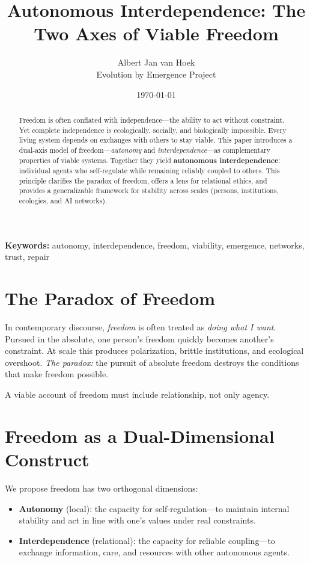 \documentclass[11pt,a4paper]{article}
\title{\textbf{Autonomous Interdependence: The Two Axes of Viable Freedom}}
\author{Albert Jan van Hoek \\ \small Evolution by Emergence Project}
\date{\today}
\begin{document}
\maketitle

\begin{abstract}
Freedom is often conflated with independence---the ability to act without constraint.
Yet complete independence is ecologically, socially, and biologically impossible.
Every living system depends on exchanges with others to stay viable.
This paper introduces a dual-axis model of freedom---\emph{autonomy} and \emph{interdependence}---as complementary properties of viable systems.
Together they yield \textbf{autonomous interdependence}: individual agents who self-regulate while remaining reliably coupled to others.
This principle clarifies the paradox of freedom, offers a lens for relational ethics, and provides a generalizable framework for stability across scales (persons, institutions, ecologies, and AI networks).
\end{abstract}

\noindent\textbf{Keywords:} autonomy, interdependence, freedom, viability, emergence, networks, trust, repair

\section{The Paradox of Freedom}
In contemporary discourse, \emph{freedom} is often treated as \emph{doing what I want}.
Pursued in the absolute, one person's freedom quickly becomes another's constraint.
At scale this produces polarization, brittle institutions, and ecological overshoot.
\emph{The paradox:} the pursuit of absolute freedom destroys the conditions that make freedom possible.

A viable account of freedom must include relationship, not only agency.

\section{Freedom as a Dual-Dimensional Construct}
We propose freedom has two orthogonal dimensions:
\begin{itemize}
    \item \textbf{Autonomy} (local): the capacity for self-regulation---to maintain internal stability and act in line with one's values under real constraints.
    \item \textbf{Interdependence} (relational): the capacity for reliable coupling---to exchange information, care, and resources with other autonomous agents.
\end{itemize}
\end{document}
